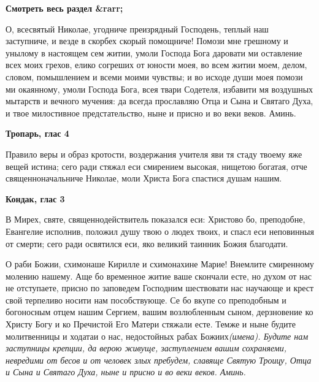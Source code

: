 




\bfseries Смотреть весь раздел &rarr;\normalfont{} 





О, всесвятый Николае, угодниче преизрядный Господень, теплый наш заступниче, и везде в скорбех скорый помощниче! Помози мне грешному и унылому в настоящем сем житии, умоли Господа Бога даровати ми оставление всех моих грехов, елико согреших от юности моея, во всем житии моем, делом, словом, помышлением и всеми моими чувствы; и во исходе души моея помози ми окаянному, умоли Господа Бога, всея твари Содетеля, избавити мя воздушных мытарств и вечного мучения: да всегда прославляю Отца и Сына и Святаго Духа, и твое милостивное предстательство, ныне и присно и во веки веков. Аминь.


\medskip


\bfseries Тропарь, глас 4\normalfont{}


Правило веры и образ кротости, воздержания учителя яви тя стаду твоему яже вещей истина; сего ради стяжал еси смирением высокая, нищетою богатая, отче священноначальниче Николае, моли Христа Бога спастися душам нашим.


\medskip


\bfseries Кондак, глас 3\normalfont{}


В Мирех, святе, священнодействитель показался еси: Христово бо, преподобне, Евангелие исполнив, положил душу твою о людех твоих, и спасл еси неповинныя от смерти; сего ради освятился еси, яко великий таинник Божия благодати. 


\mychapterending




О раби Божии, схимонаше Кирилле и схимонахине Марие! Внемлите смиренному молению нашему. Аще бо временное житие ваше скончали есте, но духом от нас не отступаете, присно по заповедем Господним шествовати нас научающе и крест свой терпеливо носити нам пособствующе. Се бо вкупе со преподобным и богоносным отцем нашим Сергием, вашим возлюбленным сыном, дерзновение ко Христу Богу и ко Пречистой Его Матери стяжали есте. Темже и ныне будите молитвенницы и ходатаи о нас, недостойных рабах Божиих\itshape  (имена)\normalfont{}. Будите нам заступницы крепции, да верою живуще, заступлением вашим сохраняеми, невредими от бесов и от человек злых пребудем, славяще Святую Троицу, Отца и Сына и Святаго Духа, ныне и присно и во веки веков. Аминь. 


